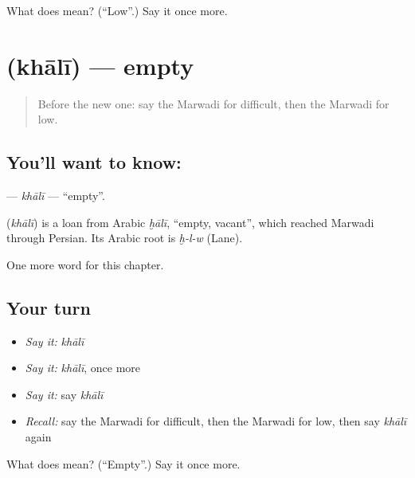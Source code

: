 \begin{tcolorbox}[breakable,colback=teal!4,colframe=teal!35!black,title={Before you move on}]
What does  mean? (\textquotedblleft{}Low\textquotedblright{}.) Say it once more.
\end{tcolorbox}
\section[\texorpdfstring{\mw{खाली} (khālī)}{खाली (khālī)}]{ (khālī) — empty}

\label{lesson:MW-C75-khali}



\begin{quote}
Before the new one: say the Marwadi for difficult, then the Marwadi for low.
\end{quote}

\subsection*{You'll want to know: }
\textbf{} — \emph{khālī} — \textquotedblleft{}empty\textquotedblright{}.

\begin{cousinweb}
\textbf{} (\emph{khālī}) is a loan from Arabic \emph{ḫālī}, \textquotedblleft{}empty, vacant\textquotedblright{}, which reached Marwadi through Persian. Its Arabic root is \emph{ḫ-l-w} (Lane).
\end{cousinweb}

\begin{grammarlens}[title={What you've built}]
One more word for this chapter.
\end{grammarlens}

\subsection*{Your turn}
\begin{itemize}
\raggedright
  \item \emph{Say it:} \emph{khālī}
  \item \emph{Say it:} \emph{khālī}, once more
  \item \emph{Say it:} say \emph{khālī}
  \item \emph{Recall:} say the Marwadi for difficult, then the Marwadi for low, then say \emph{khālī} again
\end{itemize}

\begin{tcolorbox}[breakable,colback=teal!4,colframe=teal!35!black,title={Before you move on}]
What does  mean? (\textquotedblleft{}Empty\textquotedblright{}.) Say it once more.
\end{tcolorbox}
